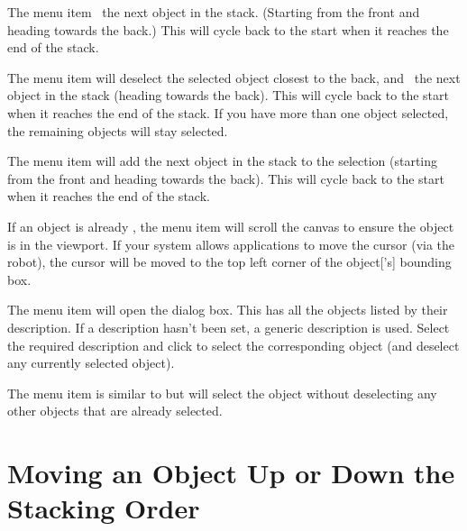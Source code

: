 
The  menu item 
\selects\ the next \gls{object} in the \gls{stack}. (Starting from the
\gls{front} and heading towards the \gls{back}.) This will cycle back to
the start when it reaches the end of the \gls{stack}.


The  menu item will deselect the
selected \gls{object} closest to the \gls{back}, and \select\
the next \gls{object} in the \gls{stack} (heading towards the \gls{back}). This
will cycle back to the start when it reaches the end of the stack.
If you have more than one \gls{object} selected, the remaining
\glspl*{object} will stay selected.


The  menu item will add
the next \gls{object} in the \gls{stack} to the selection (starting from
the \gls{front} and heading towards the \gls{back}). This will cycle back to
the start when it reaches the end of the stack.


If an \gls{object} is already \selected, the 
menu item will scroll the \gls{canvas} to ensure the \gls{object} is
in the viewport. If your system allows applications to move the
cursor (via the \gls{robot}), the cursor will be moved to the top left corner of the
\gls{object}['s] bounding box.


The  menu item will open the
 dialog box. This has all the \glspl{object}
listed by their description.  If a description hasn't been set, a
generic description is used.  Select the required description and
click \btn{okay} to select the corresponding \gls{object} (and
deselect any currently selected \gls{object}).


The  menu item is similar to 
 but will select the \gls{object}
without deselecting any other \glspl{object} that are already
selected.

\section{Moving an Object Up or Down the Stacking Order}\label{sec:moveupordown}

